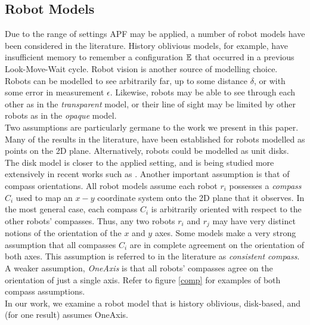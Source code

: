 \documentclass[preprint,10pt]{elsarticle}
\begin{document}
\subsection{Robot Models} 
\label{models}
Due to the range of settings APF may be applied, a number of robot models have been considered 
in the literature. History oblivious models, for example, have insufficient memory to remember
a configuration $\mathbb{E}$ that occurred in a previous Look-Move-Wait cycle. Robot vision is another 
source of modelling choice. Robots can be modelled to see arbitrarily far, up to some distance $\delta$, or
with some error in measurement $\epsilon$. Likewise, robots may be able to see through each other as in the 
\textit{transparent} model, or their line of sight may be limited by other robots as in the \textit{opaque}
model. \\

Two assumptions are particularly germane to the work we present in this paper. Many of the results in 
the literature, have been established for robots modelled as points on the 2D plane. Alternatively,
robots could be modelled as unit disks. The disk model is closer to the applied setting, and is being
studied more extensively in recent works such as \cite{agatha13distrib}.
Another important assumption is that of compass orientations.
All robot models assume each robot $r_i$ possesses a \textit{compass} $C_i$ used to map an $x-y$ coordinate system
onto the 2D plane that it observes. In the most general case, each compass $C_i$ is arbitrarily oriented with
respect to the other robots' compasses. Thus, any two robots $r_i$ and $r_j$ may have very distinct notions
of the orientation of the $x$ and $y$ axes. Some models make a very strong assumption that all compasses $C_i$ 
are in complete agreement on the orientation of both axes. This assumption is referred to in the 
literature as \textit{consistent compass}. A weaker assumption, \textit{OneAxis} is 
that all robots' compasses agree on the orientation of just a single axis. Refer
to figure \ref{comp} for examples of both compass assumptions. \\

In our work, we examine a robot model that is history oblivious, disk-based, and (for one result) assumes OneAxis.
\end{document}
